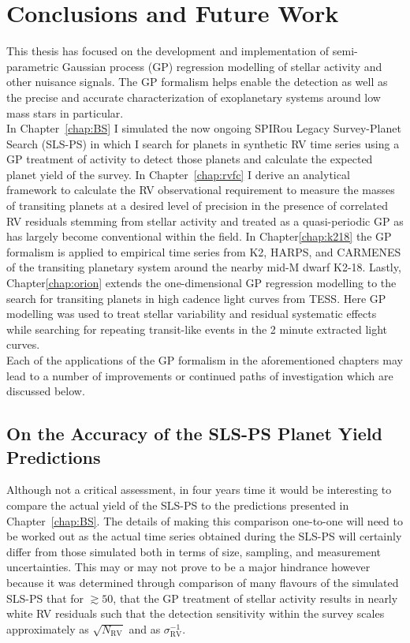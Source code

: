 \chapter{Conclusions and Future Work}

This thesis has focused on the development and implementation of
semi-parametric Gaussian process (GP) regression modelling of stellar activity
and other nuisance signals. The GP formalism helps enable the detection as
well as the precise and accurate characterization of exoplanetary systems
around low mass stars in particular. \\

In Chapter~\ref{chap:BS} I simulated the
now ongoing SPIRou Legacy Survey-Planet Search (SLS-PS)
in which I search for planets
in synthetic RV time series using a GP treatment of activity to detect
those planets and calculate the expected planet yield of the survey. In
Chapter~\ref{chap:rvfc} I derive an analytical framework to calculate the
RV observational requirement to measure the masses of transiting planets at
a desired level of precision in the presence of correlated RV residuals stemming
from stellar activity and treated as a quasi-periodic GP as has largely become
conventional within the field. In Chapter\ref{chap:k218} the GP formalism is
applied to empirical time series from K2, HARPS, and CARMENES of the transiting
planetary system around the nearby mid-M dwarf K2-18. Lastly,
Chapter\ref{chap:orion} extends the one-dimensional GP regression modelling to
the search for transiting planets in high cadence light curves from TESS. Here
GP modelling was used to treat stellar variability and residual systematic
effects while searching for repeating transit-like events in the 2 minute
extracted light curves. \\

Each of the applications of the GP formalism in the aforementioned chapters
may lead to a number of improvements or continued paths of investigation which
are discussed below.

\section{On the Accuracy of the SLS-PS Planet Yield Predictions}
Although not a critical assessment, in four years time it would be interesting
to compare the actual yield of the SLS-PS to the predictions presented in
Chapter~\ref{chap:BS}. The details of making this comparison one-to-one will
need to be worked out as the actual time series obtained during the SLS-PS will
certainly differ from those simulated both in terms of size, sampling, and
measurement uncertainties. This may or may not prove to be a major hindrance
however because it was determined through comparison of many flavours of the
simulated SLS-PS that for \nrv{} $\gtrsim 50$, that the GP treatment of stellar
activity results in nearly white RV residuals such that the detection
sensitivity within the survey scales approximately as $\sqrt{N_{\text{RV}}}$ and
as $\sigma_{\text{RV}}^{-1}$. \\

